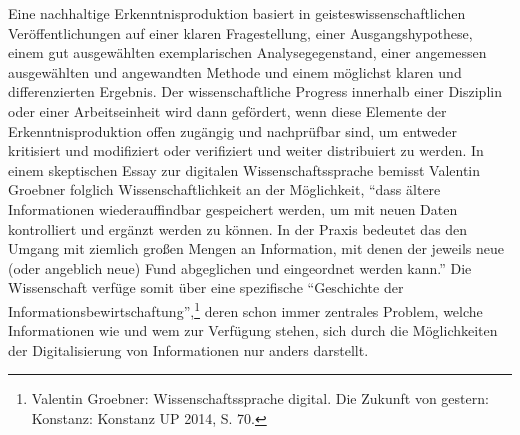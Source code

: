 \documentclass[a4paper,
fontsize=11pt,
oneside,
numbers=noperiodatend,
parskip=half-,
bibliography=totoc,
final
]{scrartcl}
\begin{document}
Eine nachhaltige Erkenntnisproduktion basiert in
geisteswissenschaftlichen Veröffentlichungen auf einer klaren
Fragestellung, einer Ausgangshypothese, einem gut ausgewählten
exemplarischen Analysegegenstand, einer angemessen ausgewählten und
angewandten Methode und einem möglichst klaren und differenzierten
Ergebnis. Der wissenschaftliche Progress innerhalb einer Disziplin oder
einer Arbeitseinheit wird dann gefördert, wenn diese Elemente der
Erkenntnisproduktion offen zugängig und nachprüfbar sind, um entweder
kritisiert und modifiziert oder verifiziert und weiter distribuiert zu
werden. In einem skeptischen Essay zur digitalen Wissenschaftssprache
bemisst Valentin Groebner folglich Wissenschaftlichkeit an der
Möglichkeit, \enquote{dass ältere Informationen wiederauffindbar
gespeichert werden, um mit neuen Daten kontrolliert und ergänzt werden
zu können. In der Praxis bedeutet das den Umgang mit ziemlich großen
Mengen an Information, mit denen der jeweils neue (oder angeblich neue)
Fund abgeglichen und eingeordnet werden kann.} Die Wissenschaft verfüge
somit über eine spezifische \enquote{Geschichte der
Informationsbewirtschaftung},\footnote{Valentin Groebner:
  Wissenschaftssprache digital. Die Zukunft von gestern: Konstanz:
  Konstanz UP 2014, S. 70.} deren schon immer zentrales Problem, welche
Informationen wie und wem zur Verfügung stehen, sich durch die
Möglichkeiten der Digitalisierung von Informationen nur anders
darstellt.
\end{document}
